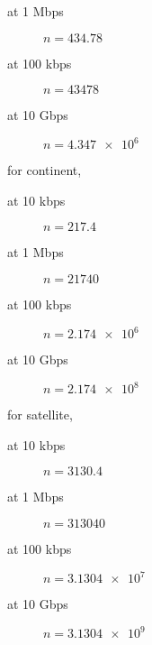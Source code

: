 \documentclass{article}
\begin{document}
\begin{enumerate}
\begin{addmargin}[1em]{1em}
\begin{description}
						\item [at 1 Mbps] $n = \SI{434.78}{}$
						\item [at 100 kbps] $n = \SI{43478}{}$
						\item [at 10 Gbps] $n = \SI{4.347e6}{}$
					\end{description}
					for continent,
					\begin{description}
						\item [at 10 kbps] $n = \SI{217.4}{}$
						\item [at 1 Mbps] $n = \SI{21740}{}$
						\item [at 100 kbps] $n = \SI{2.174e6}{}$
						\item [at 10 Gbps] $n = \SI{2.174e8}{}$
					\end{description}
					for satellite,
					\begin{description}
						\item [at 10 kbps] $n = \SI{3130.4}{}$
						\item [at 1 Mbps] $n = \SI{313040}{}$
						\item [at 100 kbps] $n = \SI{3.1304e7}{}$
						\item [at 10 Gbps] $n = \SI{3.1304e9}{}$
					\end{description}
				\end{addmargin}
	\end{enumerate}
\end{document}

